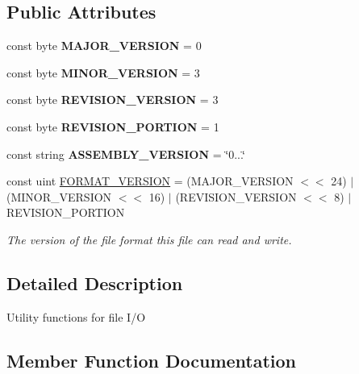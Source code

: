\subsection*{Public Attributes}
\begin{DoxyCompactItemize}
\item 
\mbox{\label{class_b_x_d_i_o_a3345532f82bd3ecce237a33039a2f41e}} 
const byte {\bfseries M\+A\+J\+O\+R\+\_\+\+V\+E\+R\+S\+I\+ON} = 0
\item 
\mbox{\label{class_b_x_d_i_o_a56ad4c2b1e70f74ed8454d04edb9010b}} 
const byte {\bfseries M\+I\+N\+O\+R\+\_\+\+V\+E\+R\+S\+I\+ON} = 3
\item 
\mbox{\label{class_b_x_d_i_o_ad9c3c2e321a6f394b6851cb4734720c1}} 
const byte {\bfseries R\+E\+V\+I\+S\+I\+O\+N\+\_\+\+V\+E\+R\+S\+I\+ON} = 3
\item 
\mbox{\label{class_b_x_d_i_o_a001b81b7743e33fc2533d55959afe0f6}} 
const byte {\bfseries R\+E\+V\+I\+S\+I\+O\+N\+\_\+\+P\+O\+R\+T\+I\+ON} = 1
\item 
\mbox{\label{class_b_x_d_i_o_a2ca0ee9e65acbf80101a960b75d36310}} 
const string {\bfseries A\+S\+S\+E\+M\+B\+L\+Y\+\_\+\+V\+E\+R\+S\+I\+ON} = \char`\"{}0...\char`\"{}
\item 
const uint \hyperlink{class_b_x_d_i_o_a5ab1de22d4eecd8734b698648875e972}{F\+O\+R\+M\+A\+T\+\_\+\+V\+E\+R\+S\+I\+ON} = (M\+A\+J\+O\+R\+\_\+\+V\+E\+R\+S\+I\+ON $<$$<$ 24) $\vert$ (M\+I\+N\+O\+R\+\_\+\+V\+E\+R\+S\+I\+ON $<$$<$ 16) $\vert$ (R\+E\+V\+I\+S\+I\+O\+N\+\_\+\+V\+E\+R\+S\+I\+ON $<$$<$ 8) $\vert$ R\+E\+V\+I\+S\+I\+O\+N\+\_\+\+P\+O\+R\+T\+I\+ON
\begin{DoxyCompactList}\small\item\em The version of the file format this file can read and write. \end{DoxyCompactList}\end{DoxyCompactItemize}


\subsection{Detailed Description}
Utility functions for file I/O 



\subsection{Member Function Documentation}
\mbox{\label{class_b_x_d_i_o_ae7803ce0f645dd421430706f86b35ebf}} 
